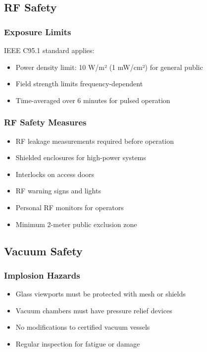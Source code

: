 \subsection{RF Safety}

\subsubsection{Exposure Limits}
IEEE C95.1 standard applies:
\begin{itemize}[noitemsep]
    \item Power density limit: 10 W/m² (1 mW/cm²) for general public
    \item Field strength limits frequency-dependent
    \item Time-averaged over 6 minutes for pulsed operation
\end{itemize}

\subsubsection{RF Safety Measures}
\begin{itemize}[noitemsep]
    \item RF leakage measurements required before operation
    \item Shielded enclosures for high-power systems
    \item Interlocks on access doors
    \item RF warning signs and lights
    \item Personal RF monitors for operators
    \item Minimum 2-meter public exclusion zone
\end{itemize}

\subsection{Vacuum Safety}

\subsubsection{Implosion Hazards}
\begin{itemize}[noitemsep]
    \item Glass viewports must be protected with mesh or shields
    \item Vacuum chambers must have pressure relief devices
    \item No modifications to certified vacuum vessels
    \item Regular inspection for fatigue or damage
\end{itemize}

